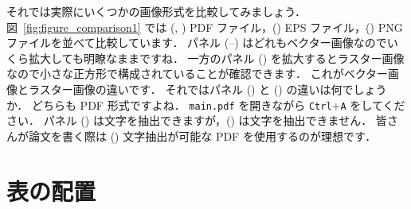 それでは実際にいくつかの画像形式を比較してみましょう．
図~\ref{fig:figure_comparison1} では (, ) PDF ファイル，() EPS ファイル，() PNG ファイルを並べて比較しています．
パネル (--) はどれもベクター画像なのでいくら拡大しても明瞭なままですね．
一方のパネル () を拡大するとラスター画像なので小さな正方形で構成されていることが確認できます．
これがベクター画像とラスター画像の違いです．
それではパネル () と () の違いは何でしょうか．
どちらも PDF 形式ですよね．
\verb|main.pdf| を開きながら \verb|Ctrl|+\verb|A| をしてください．
パネル () は文字を抽出できますが，() は文字を抽出できません．
皆さんが論文を書く際は () 文字抽出が可能な PDF を使用するのが理想です．


\section{表の配置}
\label{sec:table}






